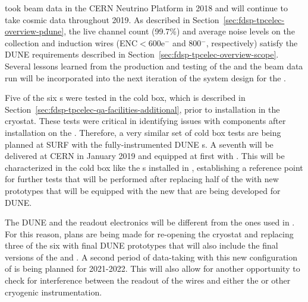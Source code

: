  took beam data in the CERN Neutrino Platform in 2018 and will continue
to take cosmic data throughout 2019. As described in Section~\ref{sec:fdsp-tpcelec-overview-pdune}, 
the live channel count (99.7\%) and average noise levels on the collection and induction wires 
(ENC$<$600e$^-$ and 800$^-$, respectively) satisfy the DUNE \single requirements described 
in Section~\ref{sec:fdsp-tpcelec-overview-scope}. Several lessons learned from the production 
and testing of the  and the beam data run will be incorporated into the 
next iteration of the system design for the .


Five of the six s were tested in the  cold box, which is described in
Section~\ref{sec:fdsp-tpcelec-qa-facilities-additional}, prior to installation in the cryostat. 
These tests were critical in identifying issues with  components after installation 
on the . Therefore, a very similar set of cold box tests are being planned at SURF 
with the fully-instrumented DUNE s. A seventh  will be delivered
at CERN in January 2019 and equipped at first with  . This
 will be characterized in the cold box like the s installed
in , establishing a reference point for further tests that will be
performed after replacing half of the  with new prototypes that will 
be equipped with the new  that are being developed for DUNE. 

The DUNE  and the readout electronics will be different from the ones used 
in . For this reason, plans are being made for re-opening the  cryostat 
and replacing three of the six  with final DUNE prototypes that will also include 
the final versions of the  and . A second period of data-taking 
with this new configuration of  is being planned for 2021-2022. This will also 
allow for another opportunity to check for interference between the readout of the  
wires and either the  or other cryogenic instrumentation.


